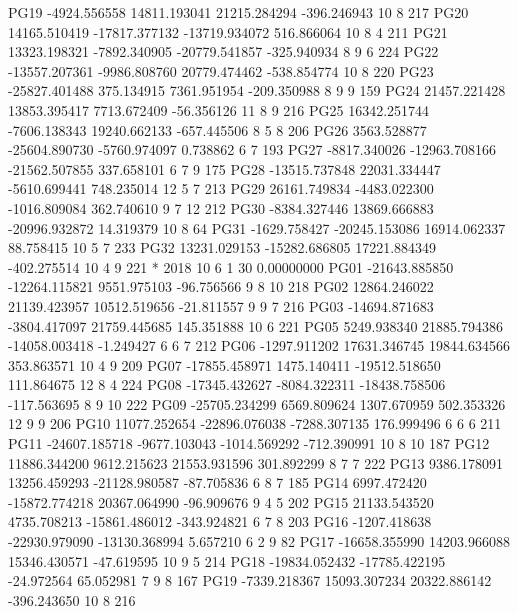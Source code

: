 PG19  -4924.556558  14811.193041  21215.284294   -396.246943 10  8    217       
PG20  14165.510419 -17817.377132 -13719.934072    516.866064 10  8  4 211       
PG21  13323.198321  -7892.340905 -20779.541857   -325.940934  8  9  6 224       
PG22 -13557.207361  -9986.808760  20779.474462   -538.854774 10  8    220       
PG23 -25827.401488    375.134915   7361.951954   -209.350988  8  9  9 159       
PG24  21457.221428  13853.395417   7713.672409    -56.356126 11  8  9 216       
PG25  16342.251744  -7606.138343  19240.662133   -657.445506  8  5  8 206       
PG26   3563.528877 -25604.890730  -5760.974097      0.738862  6     7 193       
PG27  -8817.340026 -12963.708166 -21562.507855    337.658101  6  7  9 175       
PG28 -13515.737848  22031.334447  -5610.699441    748.235014 12  5  7 213       
PG29  26161.749834  -4483.022300  -1016.809084    362.740610  9  7 12 212       
PG30  -8384.327446  13869.666883 -20996.932872     14.319379 10  8     64       
PG31  -1629.758427 -20245.153086  16914.062337     88.758415 10  5  7 233       
PG32  13231.029153 -15282.686805  17221.884349   -402.275514 10  4  9 221       
*  2018 10  6  1 30  0.00000000
PG01 -21643.885850 -12264.115821   9551.975103    -96.756566  9  8 10 218       
PG02  12864.246022  21139.423957  10512.519656    -21.811557  9  9  7 216       
PG03 -14694.871683  -3804.417097  21759.445685    145.351888 10  6    221       
PG05   5249.938340  21885.794386 -14058.003418     -1.249427  6  6  7 212       
PG06  -1297.911202  17631.346745  19844.634566    353.863571 10  4  9 209       
PG07 -17855.458971   1475.140411 -19512.518650    111.864675 12  8  4 224       
PG08 -17345.432627  -8084.322311 -18438.758506   -117.563695  8  9 10 222       
PG09 -25705.234299   6569.809624   1307.670959    502.353326 12  9  9 206       
PG10  11077.252654 -22896.076038  -7288.307135    176.999496  6  6  6 211       
PG11 -24607.185718  -9677.103043  -1014.569292   -712.390991 10  8 10 187       
PG12  11886.344200   9612.215623  21553.931596    301.892299  8  7  7 222       
PG13   9386.178091  13256.459293 -21128.980587    -87.705836  6  8  7 185       
PG14   6997.472420 -15872.774218  20367.064990    -96.909676  9  4  5 202       
PG15  21133.543520   4735.708213 -15861.486012   -343.924821  6  7  8 203       
PG16  -1207.418638 -22930.979090 -13130.368994      5.657210  6  2  9  82       
PG17 -16658.355990  14203.966088  15346.430571    -47.619595 10  9  5 214       
PG18 -19834.052432 -17785.422195    -24.972564     65.052981  7  9  8 167       
PG19  -7339.218367  15093.307234  20322.886142   -396.243650 10  8    216       
